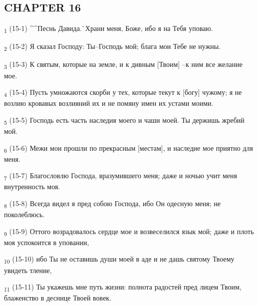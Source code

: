 \subsection{CHAPTER 16}
\begin{tcolorbox}
\textsubscript{1} (15-1) ^^Песнь Давида.^^ Храни меня, Боже, ибо я на Тебя уповаю.
\end{tcolorbox}
\begin{tcolorbox}
\textsubscript{2} (15-2) Я сказал Господу: Ты--Господь мой; блага мои Тебе не нужны.
\end{tcolorbox}
\begin{tcolorbox}
\textsubscript{3} (15-3) К святым, которые на земле, и к дивным [Твоим] --к ним все желание мое.
\end{tcolorbox}
\begin{tcolorbox}
\textsubscript{4} (15-4) Пусть умножаются скорби у тех, которые текут к [богу] чужому; я не возлию кровавых возлияний их и не помяну имен их устами моими.
\end{tcolorbox}
\begin{tcolorbox}
\textsubscript{5} (15-5) Господь есть часть наследия моего и чаши моей. Ты держишь жребий мой.
\end{tcolorbox}
\begin{tcolorbox}
\textsubscript{6} (15-6) Межи мои прошли по прекрасным [местам], и наследие мое приятно для меня.
\end{tcolorbox}
\begin{tcolorbox}
\textsubscript{7} (15-7) Благословлю Господа, вразумившего меня; даже и ночью учит меня внутренность моя.
\end{tcolorbox}
\begin{tcolorbox}
\textsubscript{8} (15-8) Всегда видел я пред собою Господа, ибо Он одесную меня; не поколеблюсь.
\end{tcolorbox}
\begin{tcolorbox}
\textsubscript{9} (15-9) Оттого возрадовалось сердце мое и возвеселился язык мой; даже и плоть моя успокоится в уповании,
\end{tcolorbox}
\begin{tcolorbox}
\textsubscript{10} (15-10) ибо Ты не оставишь души моей в аде и не дашь святому Твоему увидеть тление,
\end{tcolorbox}
\begin{tcolorbox}
\textsubscript{11} (15-11) Ты укажешь мне путь жизни: полнота радостей пред лицем Твоим, блаженство в деснице Твоей вовек.
\end{tcolorbox}
